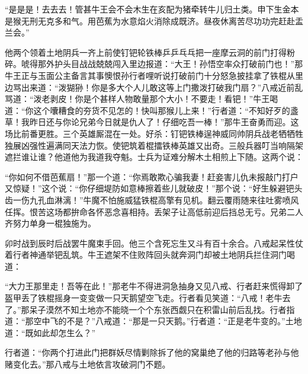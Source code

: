 \documentclass[12pt,UTF8]{ctexbook}
\begin{document}
“是是是！去去去！管甚牛王会不会木生在亥配为猪牵转牛儿归土类。申下生金本是猴无刑无克多和气。用芭蕉为水意焰火消除成既济。昼夜休离苦尽功功完赶赴盂兰会。”

他两个领着土地阴兵一齐上前使钉钯轮铁棒乒乒乓乓把一座摩云洞的前门打得粉碎。唬得那外护头目战战兢兢闯入里边报道：“大王！孙悟空率众打破前门也！”那牛王正与玉面公主备言其事懊恨孙行者哩听说打破前门十分怒急披挂拿了铁棍从里边骂出来道：“泼猢狲！你是多大个人儿敢这等上门撒泼打破我门扇？”八戒近前乱骂道：“泼老剥皮！你是个甚样人物敢量那个大小！不要走！看钯！”牛王喝道：“你这个囔糟食的夯货不见怎的！快叫那猴儿上来！”行者道：“不知好歹的盞草！我昨日还与你论兄弟今日就是仇人了！仔细吃吾一棒！”那牛王奋勇而迎。这场比前番更胜。三个英雄厮混在一处。好杀：钉钯铁棒逞神威同帅阴兵战老牺牺牲独展凶强性遍满同天法力恢。使钯筑着棍擂铁棒英雄又出奇。三般兵器叮当响隔架遮拦谁让谁？他道他为我道我夺魁。士兵为证难分解木土相煎上下随。这两个说：

“你如何不借芭蕉扇！”那一个道：“你焉敢欺心骗我妻！赶妾害儿仇未报敲门打户又惊疑！”这个说：“你仔细堤防如意棒擦着些儿就破皮！”那个说：“好生躲避钯头齿一伤九孔血淋漓！”牛魔不怕施威猛铁棍高擎有见机。翻云覆雨随来往吐雾喷风任挥。恨苦这场都拚命各怀恶念喜相持。丢架子让高低前迎后挡总无亏。兄弟二人齐努力单身一棍独施为。

卯时战到辰时后战罢牛魔束手回。他三个含死忘生又斗有百十余合。八戒起呆性仗着行者神通举钯乱筑。牛王遮架不住败阵回头就奔洞门却被土地阴兵拦住洞门喝道：

“大力王那里走！吾等在此！”那老牛不得进洞急抽身又见八戒、行者赶来慌得卸了盔甲丢了铁棍摇身一变变做一只天鹅望空飞走。行者看见笑道：“八戒！老牛去了。”那呆子漠然不知土地亦不能晓一个个东张西觑只在积雷山前后乱找。行者指道：“那空中飞的不是？”八戒道：“那是一只天鹅。”行者道：“正是老牛变的。”土地道：“既如此却怎生么？”

行者道：“你两个打进此门把群妖尽情剿除拆了他的窝巢绝了他的归路等老孙与他赌变化去。”那八戒与土地依言攻破洞门不题。
\end{document}

